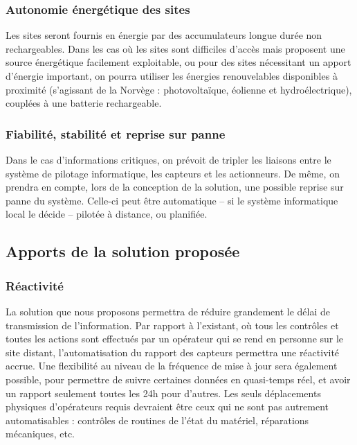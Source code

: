 \documentclass[a4paper, 11pt, draft]{article}
\begin{document}
\subsubsection{Autonomie énergétique des sites}

Les sites seront fournis en énergie par des accumulateurs longue durée non rechargeables. Dans les cas où les sites sont difficiles d'accès mais proposent une source énergétique facilement exploitable, ou pour des sites nécessitant un apport d'énergie important, on pourra utiliser les énergies renouvelables disponibles à proximité (s'agissant de la Norvège : photovoltaïque, éolienne et hydroélectrique), couplées à une batterie rechargeable.

\subsubsection{Fiabilité, stabilité et reprise sur panne}

Dans le cas d'informations critiques, on prévoit de tripler les liaisons entre le système de pilotage informatique, les capteurs et les actionneurs. De même, on prendra en compte, lors de la conception de la solution, une possible reprise sur panne du système. Celle-ci peut être automatique -- si le système informatique local le décide -- pilotée à distance, ou planifiée.

\subsection{Apports de la solution proposée}

\subsubsection{Réactivité}

La solution que nous proposons permettra de réduire grandement le délai de transmission de l'information. Par rapport à l'existant, où tous les contrôles et toutes les actions sont effectués par un opérateur qui se rend en personne sur le site distant, l'automatisation du rapport des capteurs permettra une réactivité accrue. Une flexibilité au niveau de la fréquence de mise à jour sera également possible, pour permettre de suivre certaines données en quasi-temps réel, et avoir un rapport seulement toutes les 24h pour d'autres.
Les seuls déplacements physiques d'opérateurs requis devraient être ceux qui ne sont pas autrement automatisables : contrôles de routines de l'état du matériel, réparations mécaniques, etc.
\end{document}
